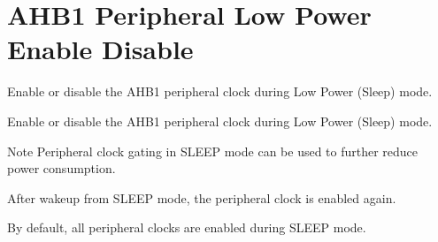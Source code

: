 \hypertarget{group___r_c_c_ex___a_h_b1___low_power___enable___disable}{}\section{A\+H\+B1 Peripheral Low Power Enable Disable}
\label{group___r_c_c_ex___a_h_b1___low_power___enable___disable}


Enable or disable the A\+H\+B1 peripheral clock during Low Power (Sleep) mode.  


Enable or disable the A\+H\+B1 peripheral clock during Low Power (Sleep) mode. 

\begin{DoxyNote}{Note}
Peripheral clock gating in S\+L\+E\+EP mode can be used to further reduce power consumption. 

After wakeup from S\+L\+E\+EP mode, the peripheral clock is enabled again. 

By default, all peripheral clocks are enabled during S\+L\+E\+EP mode. 
\end{DoxyNote}
